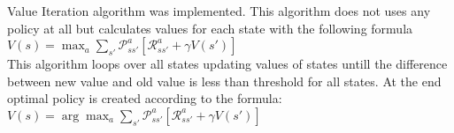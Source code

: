 
Value Iteration algorithm was implemented. This algorithm does not uses any policy at all but calculates values for each state with the following formula \\


\begin{math}
  V(s) = \max_a \sum_{s'} \mathcal{P}_{ss'}^a \left[\mathcal{R}_{ss'}^a + \gamma V(s') \right]
\end{math} \\

This algorithm loops over all states updating values of states untill the difference between new value and old value is less than threshold for all states. At the end optimal policy is created according to the formula: \\


\begin{math}
V(s) =\arg\max_a \sum_{s'} \mathcal{P}_{ss'}^a \left[\mathcal{R}_{ss'}^a + \gamma V(s') \right]
\end{math} \\